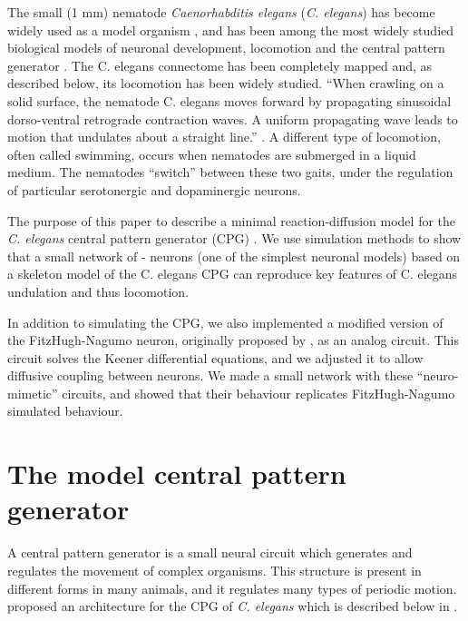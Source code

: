 \documentclass[
    11pt,
]{article}
\begin{document}
The small (1 mm) nematode \emph{Caenorhabditis elegans} (\emph{C. elegans}) has become widely used as a model organism \citep{corsi2015}, and has been among the most widely studied biological models of neuronal development, locomotion and the central pattern generator \citep{katz2016}.
The C. elegans connectome has been completely mapped \citep{jabr} and, as described below, its locomotion has been widely studied.
``When crawling on a solid surface, the nematode C. elegans moves forward by propagating sinusoidal dorso-ventral retrograde contraction waves. A uniform propagating wave leads to motion that undulates about a straight line.'' \citep{kim2011}.
A different type of locomotion, often called swimming, occurs when nematodes are submerged in a liquid medium. The nematodes “switch” between these two gaits, under the regulation of particular serotonergic and dopaminergic neurons.

The purpose of this paper to describe a minimal reaction-diffusion model for the \emph{C. elegans} central pattern generator (CPG) \citep{xu2018, wen2012}. We use simulation methods to show that a small network of \citet{fitzhugh1955}-\citet{nagumo1962} neurons (one of the simplest neuronal models) based on a skeleton model of the C. elegans CPG can reproduce key features of C. elegans undulation \citep{magnes2012} and thus locomotion.

In addition to simulating the CPG, we also implemented a modified version of the FitzHugh-Nagumo neuron, originally proposed by \citet{keener1983}, as an analog circuit.  This circuit solves the Keener differential equations, and we adjusted it to allow diffusive coupling between neurons.  We made a small network with these ``neuro-mimetic'' circuits, and showed that their behaviour replicates FitzHugh-Nagumo simulated behaviour.

\section{The model central pattern generator}


A central pattern generator is a small neural circuit which generates and regulates the movement of complex organisms.  This structure is present in different forms in many animals, and it regulates many types of periodic motion.  \citet{xu2018} proposed an architecture for the CPG of \emph{C. elegans} which is described below in .
\end{document}
